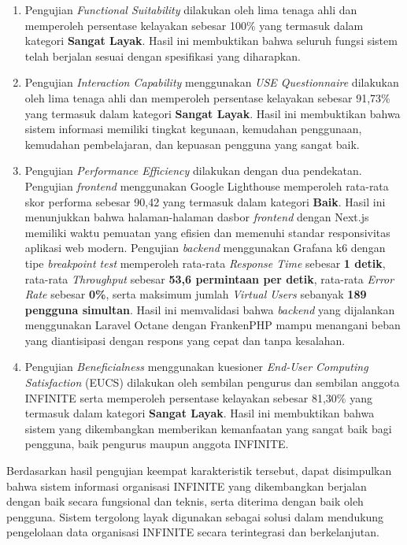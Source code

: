 \begin{enumerate}[label=\alph*.]
      \item Pengujian \textit{Functional Suitability} dilakukan oleh lima tenaga ahli dan memperoleh persentase kelayakan sebesar 100\% yang termasuk dalam kategori \textbf{Sangat Layak}. Hasil ini membuktikan bahwa seluruh fungsi sistem telah berjalan sesuai dengan spesifikasi yang diharapkan.
      \item Pengujian \textit{Interaction Capability} menggunakan \textit{USE Questionnaire} dilakukan oleh lima tenaga ahli dan memperoleh persentase kelayakan sebesar 91{,}73\% yang termasuk dalam kategori \textbf{Sangat Layak}. Hasil ini membuktikan bahwa sistem informasi memiliki tingkat kegunaan, kemudahan penggunaan, kemudahan pembelajaran, dan kepuasan pengguna yang sangat baik.
      \item Pengujian \textit{Performance Efficiency} dilakukan dengan dua pendekatan. Pengujian \textit{frontend} menggunakan Google Lighthouse memperoleh rata-rata skor performa sebesar 90{,}42 yang termasuk dalam kategori \textbf{Baik}. Hasil ini menunjukkan bahwa halaman-halaman dasbor \textit{frontend} dengan Next.js memiliki waktu pemuatan yang efisien dan memenuhi standar responsivitas aplikasi web modern. Pengujian \textit{backend} menggunakan Grafana k6 dengan tipe \textit{breakpoint test} memperoleh rata-rata \textit{Response Time} sebesar \textbf{1 detik}, rata-rata \textit{Throughput} sebesar \textbf{53{,}6 permintaan per detik}, rata-rata \textit{Error Rate} sebesar \textbf{0\%}, serta maksimum jumlah \textit{Virtual Users} sebanyak \textbf{189 pengguna simultan}. Hasil ini memvalidasi bahwa \textit{backend} yang dijalankan menggunakan Laravel Octane dengan FrankenPHP mampu menangani beban yang diantisipasi dengan respons yang cepat dan tanpa kesalahan.
      \item Pengujian \textit{Beneficialness} menggunakan kuesioner \textit{End-User Computing Satisfaction} (EUCS) dilakukan oleh sembilan pengurus dan sembilan anggota INFINITE serta memperoleh persentase kelayakan sebesar 81{,}30\% yang termasuk dalam kategori \textbf{Sangat Layak}. Hasil ini membuktikan bahwa sistem yang dikembangkan memberikan kemanfaatan yang sangat baik bagi pengguna, baik pengurus maupun anggota INFINITE.
\end{enumerate}

Berdasarkan hasil pengujian keempat karakteristik tersebut, dapat disimpulkan bahwa sistem informasi organisasi INFINITE yang dikembangkan berjalan dengan baik secara fungsional dan teknis, serta diterima dengan baik oleh pengguna. Sistem tergolong layak digunakan sebagai solusi dalam mendukung pengelolaan data organisasi INFINITE secara terintegrasi dan berkelanjutan.